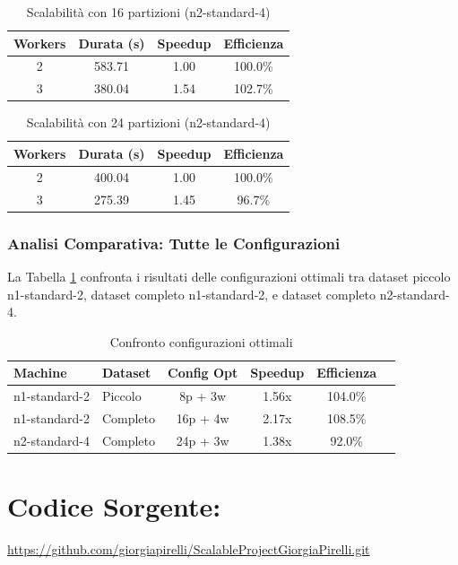 \documentclass[8pt,a4paper]{article}
\begin{document}
\begin{table}[H]
\centering
\caption{Scalabilità con 16 partizioni (n2-standard-4)}
\begin{tabular}{|c|c|c|c|}
\hline
\textbf{Workers} & \textbf{Durata (s)} & \textbf{Speedup} & \textbf{Efficienza} \\
\hline
2 & 583.71 & 1.00 & 100.0\% \\
3 & 380.04 & 1.54 & 102.7\% \\
\hline
\end{tabular}
\end{table}

\begin{table}[H]
\centering
\caption{Scalabilità con 24 partizioni (n2-standard-4)}
\begin{tabular}{|c|c|c|c|}
\hline
\textbf{Workers} & \textbf{Durata (s)} & \textbf{Speedup} & \textbf{Efficienza} \\
\hline
2 & 400.04 & 1.00 & 100.0\% \\
3 & 275.39 & 1.45 & 96.7\% \\
\hline
\end{tabular}
\end{table}

\subsubsection{Analisi Comparativa: Tutte le Configurazioni}

La Tabella \ref{tab:comparison_all} confronta i risultati delle configurazioni ottimali tra dataset piccolo n1-standard-2, dataset completo n1-standard-2, e dataset completo n2-standard-4.

\begin{table}[H]
\centering
\caption{Confronto configurazioni ottimali}
\label{tab:comparison_all}
\begin{tabular}{|l|l|c|c|c|c|}
\hline
\textbf{Machine} & \textbf{Dataset} & \textbf{Config Opt} & \textbf{Speedup} & \textbf{Efficienza} \\
\hline
n1-standard-2 & Piccolo  & 8p + 3w & 1.56x & 104.0\% \\
n1-standard-2 & Completo & 16p + 4w & 2.17x & 108.5\% \\
n2-standard-4 & Completo & 24p + 3w & 1.38x & 92.0\% \\
\hline
\end{tabular}
\end{table}

\section{Codice Sorgente:} \url{https://github.com/giorgiapirelli/ScalableProjectGiorgiaPirelli.git}
\end{document}
